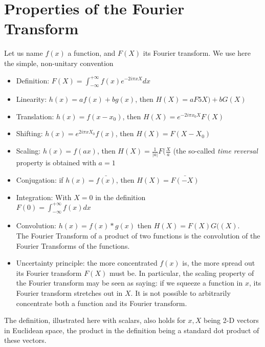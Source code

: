\documentclass[11pt]{article}
\begin{document}
\section{Properties of the Fourier Transform}
\label{app:fourier}
Let us name $f(x)$ a function, and $F(X)$ its Fourier transform. We
use here the simple, non-unitary convention
\begin{itemize}
\item Definition: $F(X) = \int_{-\infty}^{+\infty} f(x) e^{-2i\pi x X} dx$
\item Linearity:  $h(x) = a f(x) + b g(x)$, then $H(X) = a F5X) + b G(X)$
\item Translation:  $h(x) = f(x-x_0)$, then $H(X) = e^{-2i\pi x_0 X} F(X)$
\item Shifting: $h(x) = e^{2i\pi x X_0} f(x)$, then $H(X) = F(X-X_0)$
\item Scaling: $h(x) = f(ax)$, then $H(X) = \frac{1}{|a|}F(\frac{X}{a}$
(the so-called \textit{time reversal} property is obtained with $a=1$
\item Conjugation: if $h(x) = \bar{f(x)}$, then $H(X) = \bar{F(-X)}$
\item Integration: With $X=0$ in the definition\\
$F(0) = \int_{-\infty}^{+\infty} f(x) dx$
\item Convolution: $h(x)= f(x) * g(x)$ then $H(X) = F(X) G((X)$. \\
The Fourier Transform of a product of two functions is the convolution of
the Fourier Transforms of the functions.
\item Uncertainty principle:  the more concentrated $f(x)$ is, the 
more spread out its Fourier transform $F(X)$ must be. In particular, 
the scaling property of the Fourier transform may be seen as saying: if 
we squeeze a function in $x$, its Fourier transform stretches out in $X$. 
It is not possible to arbitrarily concentrate both a function and its 
Fourier transform. 
\end{itemize}
The definition, illustrated here with scalars, also holds for $x,X$ 
being 2-D vectors in Euclidean space, the product in the definition 
being a standard dot product of these vectors. 






\printindex{} %
\end{document}
